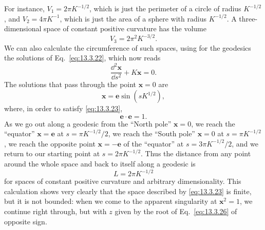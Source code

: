 For instance, \(V_1=2\pi K^{-1/2}\), which is just the perimeter of a
circle of radius \(K^{-1/2}\), and \(V_2=4\pi K^{-1}\), which is just the
area of a sphere with radius \(K^{-1/2}\). A three-dimensional space of
constant positive curvature has the volume
\[
  V_3=2\pi^2K^{-3/2}.
\]
We can also calculate the circumference of such spaces, using for the
geodesics the solutions of Eq.~\eqref{eq:13.3.22}, which now reads
\begin{equation}
  \frac{\dd^2\mathbf{x}}{\dd s^2}+K\mathbf{x}=0.
  \tag{13.3.30}\label{eq:13.3.30}
\end{equation}
The solutions that pass through the point \(\mathbf{x}=0\) are
\begin{equation}
  \mathbf{x}
  =
  \mathbf{e}\sin\!\left(sK^{1/2}\right),
  \tag{13.3.31}\label{eq:13.3.31}
\end{equation}
where, in order to satisfy \eqref{eq:13.3.23},
\begin{equation}
  \mathbf{e}\cdot\mathbf{e}=1.
  \tag{13.3.32}\label{eq:13.3.32}
\end{equation}
As we go out along a geodesic from the ``North pole''
\(\mathbf{x}=0\), we reach the ``equator'' \(\mathbf{x}=\mathbf{e}\) at
\(s=\pi K^{-1/2}/2\), we reach the ``South pole'' \(\mathbf{x}=0\) at
\(s=\pi K^{-1/2}\), we reach the opposite point
\(\mathbf{x}=-\mathbf{e}\) of the ``equator'' at
\(s=3\pi K^{-1/2}/2\), and we return to our starting point at
\(s=2\pi K^{-1/2}\). Thus the distance from any point around the whole
space and back to itself along a geodesic is
\begin{equation}
  L=2\pi K^{-1/2}
  \tag{13.3.33}\label{eq:13.3.33}
\end{equation}
for spaces of constant positive curvature and arbitrary dimensionality.
This calculation shows very clearly that the space described by
\eqref{eq:13.3.23} is finite, but it is not bounded: when we come to the
apparent singularity at \(\mathbf{x}^2=1\), we continue right through, but
with \(z\) given by the root of Eq.~\eqref{eq:13.3.26} of opposite sign.


